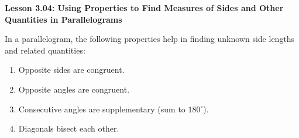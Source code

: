 \begin{center}
\textbf{Lesson 3.04: Using Properties to Find Measures of Sides and Other Quantities in Parallelograms}
\end{center}

\vspace*{-1.5ex}

\noindent In a parallelogram, the following properties help in finding unknown side lengths and related quantities:
\begin{enumerate}[label=\color{blue}\arabic*.]
    \item Opposite sides are congruent.
    \item Opposite angles are congruent.
    \item Consecutive angles are supplementary (sum to \(180^\circ\)).
    \item Diagonals bisect each other.
\end{enumerate}
